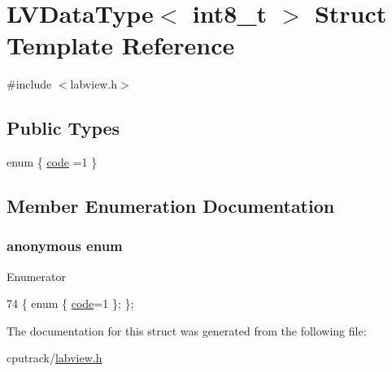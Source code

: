 \hypertarget{struct_l_v_data_type_3_01int8__t_01_4}{}\section{L\+V\+Data\+Type$<$ int8\+\_\+t $>$ Struct Template Reference}
\label{struct_l_v_data_type_3_01int8__t_01_4}


{\ttfamily \#include $<$labview.\+h$>$}

\subsection*{Public Types}
\begin{DoxyCompactItemize}
\item 
enum \{ \hyperlink{struct_l_v_data_type_3_01int8__t_01_4_ae669d33c5cebb6f9225582e393da094dae57b9d4be15f8bb048f92b4d00d7e1f9}{code} =1
 \}
\end{DoxyCompactItemize}


\subsection{Member Enumeration Documentation}
\subsubsection[{\texorpdfstring{anonymous enum}{anonymous enum}}]{\setlength{\rightskip}{0pt plus 5cm}anonymous enum}\hypertarget{struct_l_v_data_type_3_01int8__t_01_4_ae669d33c5cebb6f9225582e393da094d}{}\label{struct_l_v_data_type_3_01int8__t_01_4_ae669d33c5cebb6f9225582e393da094d}
\begin{Desc}
\item[Enumerator]\par
\begin{description}
\item[{\em 
code\hypertarget{struct_l_v_data_type_3_01int8__t_01_4_ae669d33c5cebb6f9225582e393da094dae57b9d4be15f8bb048f92b4d00d7e1f9}{}\label{struct_l_v_data_type_3_01int8__t_01_4_ae669d33c5cebb6f9225582e393da094dae57b9d4be15f8bb048f92b4d00d7e1f9}
}]\end{description}
\end{Desc}

\begin{DoxyCode}
74 \{ \textcolor{keyword}{enum} \{ \hyperlink{struct_l_v_data_type_3_01int8__t_01_4_ae669d33c5cebb6f9225582e393da094dae57b9d4be15f8bb048f92b4d00d7e1f9}{code}=1 \}; \};
\end{DoxyCode}


The documentation for this struct was generated from the following file\+:\begin{DoxyCompactItemize}
\item 
cputrack/\hyperlink{labview_8h}{labview.\+h}\end{DoxyCompactItemize}
